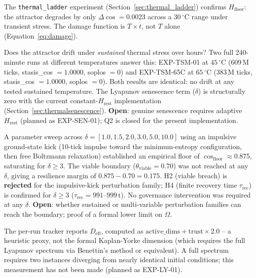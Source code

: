\documentclass[11pt, a4paper]{article}
\begin{document}
\begin{description}[itemsep=0.55em]

  \item[Q1 -- Thermal response curve (resolved)]
    The \texttt{thermal\_ladder} experiment (Section~\ref{sec:thermal_ladder})
    confirms $H_\text{floor}$: the attractor degrades by only $\Delta\cos = 0.0023$
    across a $30\,^\circ\mathrm{C}$ range under transient stress.
    The damage function is $T \times t$, not $T$ alone (Equation~\ref{eq:damage}).

  \item[Q2 -- Thermal senescence (resolved for constant-$H_\text{rest}$ regime)]
    Does the attractor drift under \emph{sustained} thermal stress over hours?
    Two full 240-minute runs at different temperatures answer this:
    EXP-TSM-01 at $45\,^\circ\mathrm{C}$ (609\,M ticks, stasis\_cos $= 1.0000$,
    soplos $= 0$) and EXP-TSM-65C at $65\,^\circ\mathrm{C}$ (383\,M ticks,
    stasis\_cos $= 1.0000$, soplos $= 0$).
    Both results are identical: no drift at any tested sustained temperature.
    The Lyapunov senescence term ($\delta$) is structurally zero with the
    current constant-$H_\text{rest}$ implementation
    (Section~\ref{sec:thermalsenescence}).
    \textbf{Open}: genuine senescence requires adaptive $H_\text{rest}$
    (planned as EXP-SEN-01); Q2 is closed for the present implementation.

  \item[Q3 -- Basin floor under extreme perturbation (EXP-AB-01, 2026-04-27)]
    A parameter sweep across $\delta = [1.0, 1.5, 2.0, 3.0, 5.0, 10.0]$
    using an impulsive ground-state kick (10-tick impulse toward the
    minimum-entropy configuration, then free Boltzmann relaxation) established
    an empirical floor of $\cos_\text{floor} \approx 0.875$, saturating for
    $\delta \geq 3$.
    The viable boundary ($\theta_\text{viable} = 0.70$) was not reached at
    any $\delta$, giving a resilience margin of $0.875 - 0.70 = 0.175$.
    H2 (viable breach) is \textbf{rejected} for the impulsive-kick perturbation
    family; H4 (finite recovery time $\tau_\text{rec}$) is confirmed for
    $\delta \geq 3$ ($\tau_\text{rec} = 991$--$999\,\text{t}$).
    No governance intervention was required at any $\delta$.
    \textbf{Open}: whether sustained or multi-variable perturbation families
    can reach the boundary; proof of a formal lower limit on $\Omega$.

  \item[Q4 -- Full Lyapunov spectrum]
    The per-run tracker reports $D_\text{eff}$, computed as
    $\text{active\_dims} + \text{trust} \times 2.0$ -- a heuristic proxy,
    not the formal Kaplan-Yorke dimension (which requires the full Lyapunov
    spectrum via Benettin's method or equivalent).
    A full spectrum requires two instances diverging from nearly identical
    initial conditions; this measurement has not been made (planned as EXP-LY-01).


\end{description}
\end{document}

